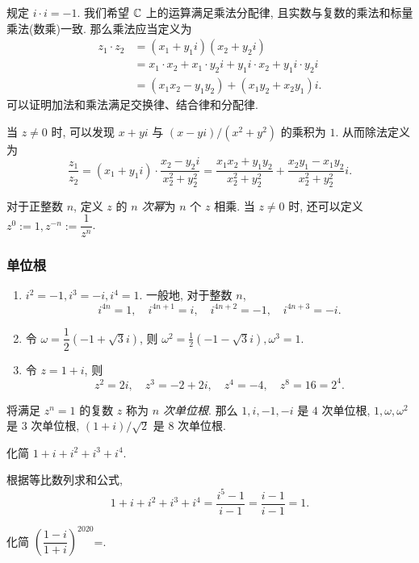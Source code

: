\alert{规定 $i\cdot i=-1$}.
我们希望 ${\mathbb{C}}$ 上的运算满足乘法分配律, 且实数与复数的乘法和标量乘法(数乘)一致.
那么乘法应当定义为
  \begin{align*}
    z_1\cdot z_2&=(x_1+y_1i)(x_2+y_2i)\\
    &=x_1\cdot x_2+x_1\cdot y_2i+y_1i\cdot x_2+y_1i\cdot y_2i\\
    &=(x_1x_2-y_1y_2)+(x_1y_2+x_2y_1)i.
  \end{align*}
可以证明加法和乘法满足交换律、结合律和分配律.

当 $z\neq0$ 时, 可以发现 $x+yi$ 与 $(x-yi)/(x^2+y^2)$ 的乘积为 $1$.
从而除法定义为
  \[\frac{z_1}{z_2}=(x_1+y_1i)\cdot\frac{x_2-y_2i}{x_2^2+y_2^2}=\frac{x_1x_2+y_1y_2}{x_2^2+y_2^2}+\frac{x_2y_1-x_1y_2}{x_2^2+y_2^2}i.\]

对于正整数 $n$, 定义 $z$ 的 \emph{$n$ 次幂}为 $n$ 个 $z$ 相乘.
当 $z\neq 0$ 时, 还可以定义 $z^0:=1,z^{-n}:=\dfrac1{z^n}$.

\subsubsection*{单位根}
\begin{example}
  \begin{enumerate}
    \item $i^2=-1,i^3=-i,i^4=1$.
    一般地, 对于整数 $n$, 
    \[i^{4n}=1,\quad i^{4n+1}=i,\quad i^{4n+2}=-1,\quad i^{4n+3}=-i.\]
    \item 令 $\omega=\dfrac12(-1+\sqrt 3i)$, 则 $\omega^2=\frac12(-1-\sqrt3i),\omega^3=1$.
    \item 令 $z=1+i$, {则
    \[z^2=2i,\quad z^3=-2+2i,\quad z^4=-4,\quad z^8=16=2^4.\]}
  \end{enumerate}
  将满足 $z^n=1$ 的复数 $z$ 称为 \emph{$n$ 次单位根}.
  那么 $1,i,-1,-i$ 是 $4$ 次单位根, $1,\omega,\omega^2$ 是 $3$ 次单位根, $(1+i)/\sqrt2$ 是 $8$ 次单位根.
\end{example}

\begin{example}
  化简 $1+i+i^2+i^3+i^4$.
\end{example}
\begin{solution}
  根据等比数列求和公式,
  \[1+i+i^2+i^3+i^4=\frac{i^5-1}{i-1}
  {=\frac{i-1}{i-1}=1.}\]
\end{solution}

\begin{exercise}
  化简 $\left(\dfrac{1-i}{1+i}\right)^{2020}$=\fillblank{}.
\end{exercise}

